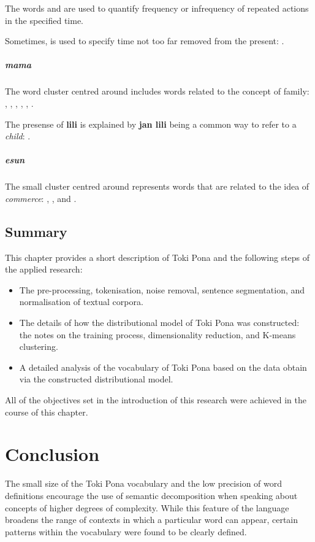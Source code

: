 \documentclass[14pt, a4paper]{extreport}
\begin{document}
The words  and  are used to quantify frequency or infrequency of repeated actions in the specified time.

Sometimes,  is used to specify time not too far removed from the present: .
      \paragraph{mama}
The word cluster centred around  includes words related to the concept of family: , , , , , .

The presense of \textbf{lili} is explained by \textbf{jan lili} being a common way to refer to a \textit{child}: .
      \paragraph{esun}
The small cluster centred around  represents words that are related to the idea of \textit{commerce}: , , and .

  \section{Summary}

This chapter provides a short description of Toki Pona and the following steps of the applied research:

\begin{itemize}
  \item The pre-processing, tokenisation, noise removal, sentence segmentation, and normalisation of textual corpora.
  \item The details of how the distributional model of Toki Pona was constructed: the notes on the training process, dimensionality reduction, and K-means clustering.
  \item A detailed analysis of the vocabulary of Toki Pona based on the data obtain via the constructed distributional model.
\end{itemize}

All of the objectives set in the introduction of this research were achieved in the course of this chapter.

\chapter{Conclusion}
The small size of the Toki Pona vocabulary and the low precision of word definitions encourage the use of semantic decomposition when speaking about concepts of higher degrees of complexity. While this feature of the language broadens the range of contexts in which a particular word can appear, certain patterns within the vocabulary were found to be clearly defined.
\end{document}
